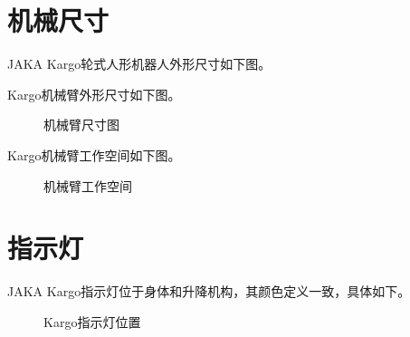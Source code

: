 \documentclass[a4paper,11pt,english,openany,oneside]{sphinxmanual}
\begin{document}
\section{机械尺寸}
\label{\detokenize{07 _u6280_u672f_u89c4_u683c:id16}}\label{\detokenize{07 _u6280_u672f_u89c4_u683c:id17}}
\sphinxAtStartPar
JAKA Kargo轮式人形机器人外形尺寸如下图。

\sphinxAtStartPar
Kargo机械臂外形尺寸如下图。

\begin{figure}[H]
\centering
\capstart

\noindent{}
\caption{机械臂尺寸图}\label{\detokenize{07 _u6280_u672f_u89c4_u683c:id62}}\end{figure}



\sphinxAtStartPar
Kargo机械臂工作空间如下图。

\begin{figure}[H]
\centering
\capstart

\noindent{}
\caption{机械臂工作空间}\label{\detokenize{07 _u6280_u672f_u89c4_u683c:id63}}\end{figure}




\section{指示灯}
\label{\detokenize{07 _u6280_u672f_u89c4_u683c:id18}}\label{\detokenize{07 _u6280_u672f_u89c4_u683c:id19}}
\sphinxAtStartPar
JAKA Kargo指示灯位于身体和升降机构，其颜色定义一致，具体如下。

\begin{figure}[H]
\centering
\capstart

\noindent{}
\caption{Kargo指示灯位置}\label{\detokenize{07 _u6280_u672f_u89c4_u683c:id64}}\end{figure}
\end{document}
